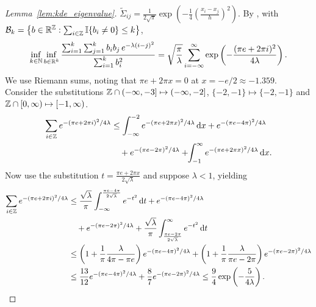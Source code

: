 \begin{proof}[Lemma~\ref{lem:kde_eigenvalue}]
  $\tilde\Sigma_{i j} = \frac{1}{2 \sqrt \pi}
  \exp \left( - \frac{1}{4} \left( \frac{x_i-x_j}{h} \right)^2 \right)$.
  By \citet[Proposition~2.4,
  Proposition~2.5 and Equation~2.10]{baxter1994norm},
  with
  $\mathcal{B}_k = \big\{b \in \mathbb{R}^{\mathbb{Z}} :
  \sum_{i \in \mathbb{Z}} \mathbb{I}\{b_i \neq 0\} \leq k \big\}$,
  \begin{align*}
    \inf_{k \in \mathbb{N}}
    \inf_{b \in \mathbb{R}^k}
    \frac{\sum_{i=1}^k \sum_{j=1}^k b_i b_j \, e^{-\lambda(i-j)^2}}
    {\sum_{i=1}^k b_i^2}
    =
    \sqrt{\frac{\pi}{\lambda}}
    \sum_{i=-\infty}^{\infty}
    \exp \left( - \frac{(\pi e + 2 \pi i)^2}{4 \lambda} \right).
  \end{align*}
  We use Riemann sums,
  noting that $\pi e + 2 \pi x = 0$ at
  $x = -e/2 \approx -1.359$.
  Consider the substitutions
  $\mathbb{Z} \cap (-\infty, -3] \mapsto (-\infty, -2]$,
  $\{-2, -1\} \mapsto \{-2, -1\}$ and
  $\mathbb{Z} \cap [0, \infty) \mapsto [-1, \infty)$.
  \begin{align*}
    \sum_{i \in \mathbb{Z}}
    e^{-(\pi e + 2 \pi i)^2 / 4 \lambda}
    &\leq
    \int_{-\infty}^{-2}
    e^{ - (\pi e + 2 \pi x)^2/4 \lambda}
    \,\mathrm{d}x
    + e^{- (\pi e - 4 \pi)^2/4 \lambda} \\
    &\quad+
    e^{ - (\pi e - 2 \pi)^2 / 4 \lambda}
    + \hspace*{-1mm} \int_{-1}^{\infty}
    e^{ -(\pi e + 2 \pi x)^2 / 4 \lambda}
    \,\mathrm{d}x.
  \end{align*}
  Now use the substitution $t = \frac{\pi e + 2 \pi x}{2 \sqrt \lambda}$
  and suppose $\lambda < 1$, yielding
  \begin{align*}
    \sum_{i \in \mathbb{Z}}
    e^{-(\pi e + 2 \pi i)^2 / 4 \lambda}
    &\leq
    \frac{\sqrt \lambda}{\pi}
    \int_{-\infty}^{\frac{\pi e - 4 \pi}{2 \sqrt \lambda}}
    e^{-t^2}
    \,\mathrm{d}t
    + e^{- (\pi e - 4 \pi)^2/4 \lambda} \\
    &\quad+
    e^{ - (\pi e - 2 \pi)^2 / 4 \lambda}
    + \frac{\sqrt \lambda}{\pi}
    \int_{\frac{\pi e - 2 \pi}{2 \sqrt \lambda}}^{\infty}
    e^{-t^2}
    \,\mathrm{d}t \\
    &\leq
    \left( 1 + \frac{1}{\pi} \frac{\lambda}{4 \pi - \pi e} \right)
    e^{-(\pi e - 4 \pi)^2 / 4 \lambda}
    +
    \left( 1 + \frac{1}{\pi} \frac{\lambda}{\pi e - 2 \pi} \right)
    e^{- (\pi e - 2 \pi)^2 / 4 \lambda} \\
    &\leq
    \frac{13}{12}
    e^{-(\pi e - 4 \pi)^2 / 4 \lambda}
    +
    \frac{8}{7}
    e^{- (\pi e - 2 \pi)^2 / 4 \lambda}
    \leq
    \frac{9}{4}
    \exp \left( - \frac{5}{4 \lambda} \right).
  \end{align*}

\end{proof}
